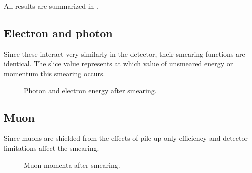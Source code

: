 All results are summarized in . 
\newpage
\subsection{Electron and photon}\label{cha:vali:sec:res:subsec:elph}
Since these interact very similarly in the detector, their smearing functions are identical.
The slice value represents at which value of unsmeared energy or momentum this smearing occurs. 


 \begin{figure}[H] %
    \hfill
{}
    \hfill
    \hfill
{}
    \caption{Photon and electron energy after smearing.}
    \label{fig:elph}
\end{figure}
\newpage
\subsection{Muon}
Since muons are shielded from the effects of pile-up only efficiency and detector limitations affect the smearing.
 \begin{figure}[H] %
    \hfill
    \caption{Muon momenta after smearing.}
    \label{fig:muon}
  \end{figure}

